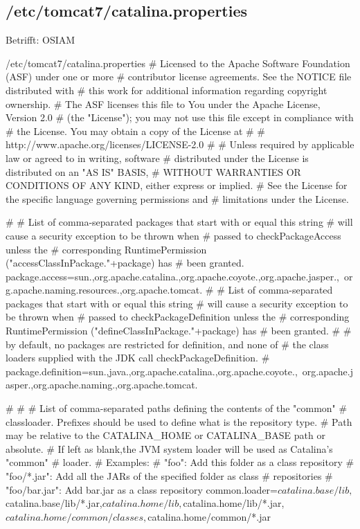 \subsection{/etc/tomcat7/catalina.properties}\label{subsec:refcfg-tc-prop}

Betrifft: OSIAM

\begin{lstdump}{/etc/tomcat7/catalina.properties}
# Licensed to the Apache Software Foundation (ASF) under one or more
# contributor license agreements.  See the NOTICE file distributed with
# this work for additional information regarding copyright ownership.
# The ASF licenses this file to You under the Apache License, Version 2.0
# (the "License"); you may not use this file except in compliance with
# the License.  You may obtain a copy of the License at
#
#     http://www.apache.org/licenses/LICENSE-2.0
#
# Unless required by applicable law or agreed to in writing, software
# distributed under the License is distributed on an "AS IS" BASIS,
# WITHOUT WARRANTIES OR CONDITIONS OF ANY KIND, either express or implied.
# See the License for the specific language governing permissions and
# limitations under the License.

#
# List of comma-separated packages that start with or equal this string
# will cause a security exception to be thrown when
# passed to checkPackageAccess unless the
# corresponding RuntimePermission ("accessClassInPackage."+package) has
# been granted.
package.access=sun.,org.apache.catalina.,org.apache.coyote.,org.apache.jasper.,\
org.apache.naming.resources.,org.apache.tomcat.
#
# List of comma-separated packages that start with or equal this string
# will cause a security exception to be thrown when
# passed to checkPackageDefinition unless the
# corresponding RuntimePermission ("defineClassInPackage."+package) has
# been granted.
#
# by default, no packages are restricted for definition, and none of
# the class loaders supplied with the JDK call checkPackageDefinition.
#
package.definition=sun.,java.,org.apache.catalina.,org.apache.coyote.,\
org.apache.jasper.,org.apache.naming.,org.apache.tomcat.

#
#
# List of comma-separated paths defining the contents of the "common"
# classloader. Prefixes should be used to define what is the repository type.
# Path may be relative to the CATALINA_HOME or CATALINA_BASE path or absolute.
# If left as blank,the JVM system loader will be used as Catalina's "common"
# loader.
# Examples:
#     "foo": Add this folder as a class repository
#     "foo/*.jar": Add all the JARs of the specified folder as class
#                  repositories
#     "foo/bar.jar": Add bar.jar as a class repository
common.loader=${catalina.base}/lib,${catalina.base}/lib/*.jar,${catalina.home}/lib,${catalina.home}/lib/*.jar,${catalina.home}/common/classes,${catalina.home}/common/*.jar


\end{lstdump}
